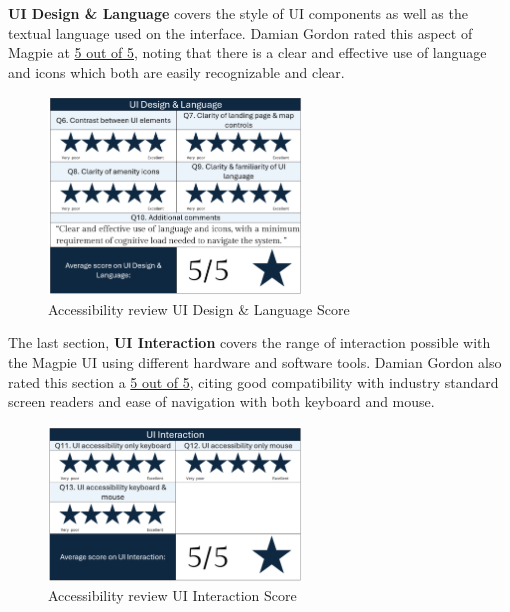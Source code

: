 \newpage
\noindent\textbf{UI Design \& Language} covers the style of UI components as well as the textual language used on the interface. Damian Gordon rated this aspect of Magpie at \underline{5 out of 5}, noting that there is a clear and effective use of language and icons which both are easily recognizable and clear.
\begin{figure}[h!]
    \centering
    \includegraphics[width=0.6\textwidth]{images/accessb-survey-design.png}
    \caption{Accessibility review \- UI Design \& Language Score}
\end{figure}

\noindent The last section, \textbf{UI Interaction} covers the range of interaction possible with the Magpie UI using different hardware and software tools. Damian Gordon also rated this section a \underline{5 out of 5}, citing good compatibility with industry standard screen readers and ease of navigation with both keyboard and mouse.\\
\begin{figure}[h!]
    \centering
    \includegraphics[width=0.6\textwidth]{images/accessb-survey-interaction.png}
    \caption{Accessibility review \- UI Interaction Score}
\end{figure}

